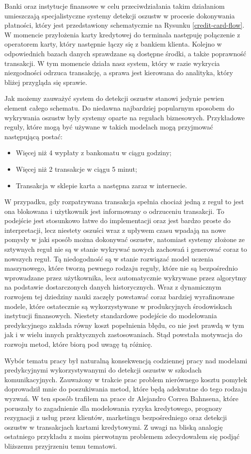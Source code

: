 \documentclass[openany]{book}
\begin{document}
	Banki oraz instytucje finansowe w celu przeciwdziałania takim działaniom umieszczają specjalistyczne systemy detekcji oszustw w procesie dokonywania płatności, który jest przedstawiony schematycznie na Rysunku \ref{credit-card-flow}. W momencie przyłożenia karty kredytowej do terminala następuję połączenie z operatorem karty, który następnie łączy się z bankiem klienta. Kolejno w odpowiednich bazach danych sprawdzane są dostępne środki, a także poprawność transakcji. W tym momencie działa nasz system, który w razie wykrycia niezgodności odrzuca transakcję, a sprawa jest kierowana do analityka, który bliżej przygląda się sprawie.

	Jak możemy zauważyć system do detekcji oszustw stanowi jedynie pewien element całego schematu. Do niedawna najbardziej popularnym sposobem do wykrywania oszustw były systemy oparte na regułach biznesowych. Przykładowe reguły, które mogą być używane w takich modelach mogą przyjmować następującą postać:
	\begin{itemize}
		\item Więcej niż 4 wypłaty z bankomatu w ciągu godziny;
		\item Więcej niż 2 transakcje w ciągu 5 minut;
		\item Transakcja w sklepie karta a następna zaraz w internecie.
	\end{itemize}
	W przypadku, gdy rozpatrywana transakcja spełnia chociaż jedną z reguł to jest ona blokowana i użytkownik jest informowany o odrzuceniu transakcji. To podejście jest stosunkowo łatwe do implementacji oraz jest bardzo proste do interpretacji, lecz niestety oszuści wraz z upływem czasu wpadają na nowe pomysły w jaki sposób można dokonywać oszustw, natomiast systemy złożone ze sztywnych reguł nie są w stanie wykrywać nowych zachowań i generować coraz to nowszych reguł. Tą niedogodność są w stanie rozwiązać model uczenia maszynowego, które tworzą pewnego rodzaju reguły, które nie są bezpośrednio wprowadzane przez użytkownika, lecz automatycznie wykrywane przez algorytmy na podstawie dostarczonych danych historycznych. Wraz z dynamicznym rozwojem tej dziedziny nauki zaczęły powstawać coraz bardziej wyrafinowane modele, które ostatecznie są wykorzystywane w produkcyjnych środowiskach instytucji finansowych. Niestety standardowe podejście do modelowania predykcyjnego zakłada równy koszt popełnienia błędu, co nie jest prawdą w tym jak i w wielu innych praktycznych zastosowaniach. Stąd powstała motywacja do rozwoju metod, które biorą pod uwagę tą różnicę.
	
	Wybór tematu pracy był naturalną konsekwencją codziennej pracy nad modelami predykcyjnymi wykorzystywanymi do detekcji oszustw w szkodach komunikacyjnych. Zauważony w trakcie prac problem nierównego kosztu pomyłek doprowadził mnie do poszukiwania metod, które będą adekwatne do tego rodzaju wyzwań. W ten sposób trafiłem na prace dr Alejandro Correa Bahnsena, które poruszały to zagadnienie dla modelowania ryzyka kredytowego, prognozy rezygnacji z usług przez klientów, marketingu bezpośredniego oraz detekcji oszustw w transakcjach kartami kredytowymi. Z uwagi na bliską analogię ostatniego przykładu z moim pierwotnym problemem zdecydowałem się podjąć bliższemu przyjrzeniu temu tematowi.
	
\end{document}
